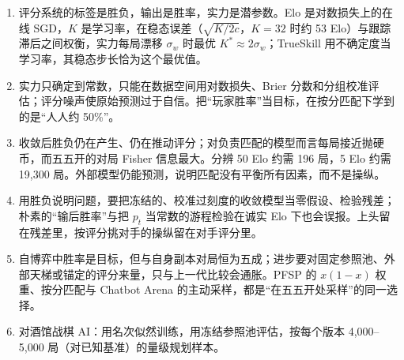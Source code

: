 \begin{keybox}[本章要点]
\begin{enumerate}
\item 评分系统的标签是胜负，输出是胜率，实力是潜参数。Elo 是对数损失上的在线 SGD，$K$ 是学习率，在稳态误差（$\sqrt{K/2c}$，$K=32$ 时约 53 Elo）与跟踪滞后之间权衡，实力每局漂移 $\sigma_w$ 时最优 $K^*\approx2\sigma_w$；TrueSkill 用不确定度当学习率，其稳态步长恰为这个最优值。
\item 实力只确定到常数，只能在数据空间用对数损失、Brier 分数和分组校准评估；评分噪声使原始预测过于自信。把“玩家胜率”当目标，在按分匹配下学到的是“人人约 50\%”。
\item 收敛后胜负仍在产生、仍在推动评分；对负责匹配的模型而言每局接近抛硬币，而五五开的对局 Fisher 信息最大。分辨 50 Elo 约需 196 局，5 Elo 约需 19,300 局。外部模型仍能预测，说明匹配没有平衡所有因素，而不是操纵。
\item 用胜负说明问题，要把冻结的、校准过刻度的收敛模型当零假设、检验残差；朴素的“输后胜率”与把 $p_t$ 当常数的游程检验在诚实 Elo 下也会误报。上头留在残差里，按评分挑对手的操纵留在对手评分里。
\item 自博弈中胜率是目标，但与自身副本对局恒为五成；进步要对固定参照池、外部天梯或锚定的评分来量，只与上一代比较会通胀。PFSP 的 $x(1-x)$ 权重、按分匹配与 Chatbot Arena 的主动采样，都是“在五五开处采样”的同一选择。
\item 对酒馆战棋 AI：用名次似然训练，用冻结参照池评估，按每个版本 4,000–5,000 局（对已知基准）的量级规划样本。
\end{enumerate}
\end{keybox}
